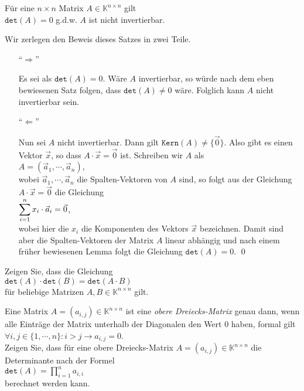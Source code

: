 \begin{Satz}
  F\"ur eine $n \times n$ Matrix $A \in \mathbb{K}^{n \times n}$ gilt
  \\[0.2cm]
  \hspace*{1.3cm}
  $\mathtt{det}(A) = 0$ \quad g.d.w. \quad $A$ ist nicht invertierbar.
\end{Satz}

\proof
Wir zerlegen den Beweis dieses Satzes in zwei Teile.
\begin{enumerate}
\item[``$\Rightarrow$'']
  
     Es sei als $\mathtt{det}(A) = 0$.  W\"are $A$ invertierbar, so w\"urde nach dem eben bewiesenen
     Satz folgen, dass $\mathtt{det}(A) \not= 0$ w\"are.  Folglich kann $A$ nicht invertierbar sein.
\item[``$\Leftarrow$'']

     Nun sei $A$ nicht invertierbar.  Dann gilt $\mathtt{Kern}(A) \not= \{\vec{0}\}$.  Also gibt
     es einen Vektor $\vec{x}$, so dass $A \cdot \vec{x} = \vec{0}$ ist.  Schreiben wir
     $A$ als
     \\[0.2cm]
     \hspace*{1.3cm}
     $A = (\vec{a}_1, \cdots, \vec{a}_n)$,
     \\[0.2cm]
     wobei $\vec{a}_1,\cdots,\vec{a}_n$ die  Spalten-Vektoren von $A$ sind, so folgt aus
     der Gleichung $A \cdot \vec{x} = \vec{0}$ die Gleichung
     \\[0.2cm]
     \hspace*{1.3cm}
     $\displaystyle\sum\limits_{i=1}^n x_i \cdot \vec{a}_i = \vec{0}$,
     \\[0.2cm]
     wobei hier die $x_i$ die Komponenten des Vektors $\vec{x}$ bezeichnen.  Damit sind aber die
     Spalten-Vektoren der Matrix $A$ linear abh\"angig und nach einem fr\"uher bewiesenen Lemma folgt
     die Gleichung
     $\mathtt{det}(A) = 0$. \qed
\end{enumerate}
\pagebreak

\exercise  
Zeigen Sie, dass die Gleichung  
\\[0.2cm] 
\hspace*{1.3cm}
$\mathtt{det}(A) \cdot \mathtt{det}(B) = \mathtt{det}(A \cdot B)$ 
\\[0.2cm] 
f\"ur beliebige Matrizen  $A, B \in \mathbb{K}^{n \times n}$ gilt.  
\eoxs  
 
\exercise
Eine Matrix $A = (a_{i,j}) \in \mathbb{K}^{n \times n}$ ist eine \emph{obere Dreiecks-Matrix} genau dann, wenn alle Eintr\"age der
Matrix unterhalb der Diagonalen den Wert $0$ haben, formal gilt
\\[0.2cm]
\hspace*{1.3cm}
$\forall i,j \in \{1,\cdots,n\}: i > j \rightarrow a_{i,j} = 0$.
\\[0.2cm]
Zeigen Sie, dass f\"ur eine obere Dreiecks-Matrix $A = (a_{i,j}) \in \mathbb{K}^{n \times n}$ die
Determinante nach der Formel
\\[0.2cm]
\hspace*{1.3cm}
$\mathtt{det}(A) = \prod\limits_{i=1}^n a_{i,i}$
\\[0.2cm]
berechnet werden kann.  
\vspace*{0.2cm}

